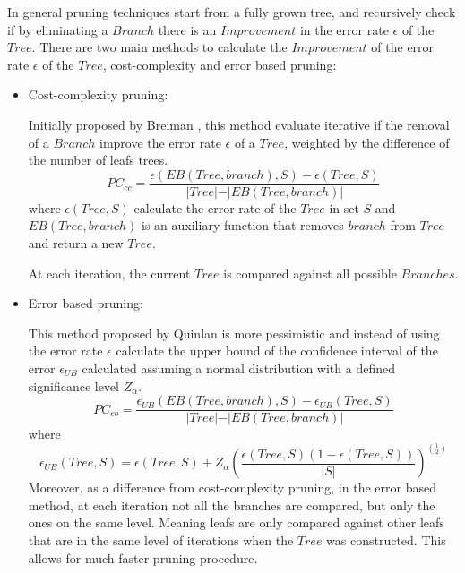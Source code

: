 { In general pruning techniques start from a fully grown tree, and recursively check if
 by eliminating a $Branch$ there is an $Improvement$ in the error rate $\epsilon$ of the $Tree$.
  There are two main methods to calculate the $Improvement$ of the error rate $\epsilon$ of the 
$Tree$,
  cost-complexity and  error based pruning:
  
  \begin{itemize}
   \item Cost-complexity pruning:
   
      Initially proposed by Breiman  \citep{Breiman1984a}, this method evaluate iterative if
      the removal of a $Branch$ improve the error rate $\epsilon$ of a $Tree$, weighted by 
      the difference of the number of leafs trees.
      \begin{equation}
      PC_{cc} = \frac{\epsilon(EB(Tree,branch),S)-\epsilon(Tree,S) }
      {\vert Tree\vert-\vert EB(Tree,branch)\vert}
      \end{equation} 
      where $\epsilon(Tree,S)$ calculate the error rate of the $Tree$ in
      set $S$ and $EB(Tree,branch)$ is an auxiliary function that 
      removes $branch$ from $Tree$ and return a new $Tree$.
      
      At each iteration, the current $Tree$ is compared against all possible $Branches$.
      

   \item Error based pruning:
   
      This method proposed by Quinlan  \citep{Quinlan1992} is more pessimistic and instead of
      using the error rate $\epsilon$ calculate the upper bound of the confidence interval
      of the error $\epsilon_{UB}$ calculated assuming a normal distribution with a defined 
significance level $Z_\alpha$.
      \begin{equation}
      PC_{eb} = \frac{\epsilon_{UB}(EB(Tree,branch),S)-\epsilon_{UB}(Tree,S) }
      {\vert Tree\vert-\vert EB(Tree,branch)\vert}
      \end{equation} 
      where 
      \begin{equation}
      \epsilon_{UB}(Tree,S)= \epsilon(Tree,S)+Z_\alpha \left( 
      \frac{\epsilon(Tree,S)(1-\epsilon(Tree,S))}{\vert S \vert} 
      \right)^{(\frac{1}{2})}
      \end{equation}   
      Moreover, as a difference from cost-complexity pruning, in the error based method, 
      at each iteration not all the branches are compared, but only the ones on the same level.
      Meaning leafs are only compared against other leafs that are in the same level of iterations
      when the $Tree$ was constructed.
      This allows for much faster pruning procedure.
  \end{itemize}
  
}
